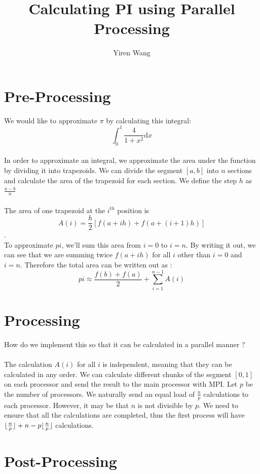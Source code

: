 \documentclass[a4paper]{article}
\title{Calculating PI using Parallel Processing}
\author{Yiren Wang}
\DeclarePairedDelimiter\floor{\lfloor}{\rfloor}
\begin{document}
\maketitle

\newpage
\section{Pre-Processing}
We would like to approximate $\pi$ by calculating this integral: $$\int_0^1 \frac{4}{1 + x^2} \mathrm{d}x$$
\\
In order to approximate an integral, we approximate the area under the function by dividing it into trapezoids. We can divide the segment $[a,b]$ into $n$ sections and calculate the area of the trapezoid for each section. We define the step $h$ as $\frac{a-b}{n}$
\\\\
The area of one trapezoid at the $i^{th}$ position is $$A(i) = \frac{h}{2}[f(a + ih) + f(a + (i+1)h)]$$. 
\\
To approximate $pi$, we'll sum this area from $i=0$ to $i=n$. By writing it out, we can see that we are summing twice $f(a + ih)$ for all $i$ other than $i=0$ and $i=n$. Therefore the total area can be written out as : 
$$ pi \approx \frac{f(b) + f(a)}{2} + \sum_{i=1}^{n-1}A(i)  $$

\section{Processing}
\smallskip
How do we implement this so that it can be calculated in a parallel manner ? 
\\\\
The calculation $A(i)$ for all $i$ is independent, meaning that they can be calculated in any order. We can calculate different chunks of the segment $[0,1]$ on each processor and send the result to the main processor with MPI. Let $p$ be the number of processors. We naturally send an equal load of $\frac{n}{p}$ calculations to each processor. However, it may be that $n$ is not divisible by $p$. We need to ensure that all the calculations are completed, thus the first process will have $\floor{\frac{n}{p}} + n - p\floor{\frac{n}{p}}$ calculations. 

\newpage
\section{Post-Processing}
\end{document}
